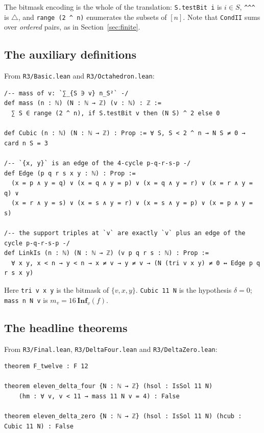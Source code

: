 \documentclass[11pt,reqno]{amsart}
\theoremstyle{plain}
\theoremstyle{definition}
\numberwithin{theorem}{section}
\newcommand{\Inf}{\mathbf{Inf}}
\newcommand{\sd}{\mathbin{\triangle}}
\begin{document}
The bitmask encoding is the whole of the translation: \texttt{S.testBit i} is $i \in S$,
\texttt{\^{}\^{}\^{}} is $\sd$, and \texttt{range (2 \^{} n)} enumerates the subsets of $[n]$.
Note that \texttt{CondII} sums over \emph{ordered} pairs, as in Section~\ref{sec:finite}.

\subsection{The auxiliary definitions}
From \texttt{R3/Basic.lean} and \texttt{R3/Octahedron.lean}:

\begin{Verbatim}[fontsize=\footnotesize,formatcom=\ttfamily,samepage=false]
/-- mass of v: `∑_{S ∋ v} n_S²` -/
def mass (n : ℕ) (N : ℕ → ℤ) (v : ℕ) : ℤ :=
  ∑ S ∈ range (2 ^ n), if S.testBit v then (N S) ^ 2 else 0

def Cubic (n : ℕ) (N : ℕ → ℤ) : Prop := ∀ S, S < 2 ^ n → N S ≠ 0 → card n S = 3

/-- `{x, y}` is an edge of the 4-cycle p-q-r-s-p -/
def Edge (p q r s x y : ℕ) : Prop :=
  (x = p ∧ y = q) ∨ (x = q ∧ y = p) ∨ (x = q ∧ y = r) ∨ (x = r ∧ y = q) ∨
  (x = r ∧ y = s) ∨ (x = s ∧ y = r) ∨ (x = s ∧ y = p) ∨ (x = p ∧ y = s)

/-- the support triples at `v` are exactly `v` plus an edge of the cycle p-q-r-s-p -/
def LinkIs (n : ℕ) (N : ℕ → ℤ) (v p q r s : ℕ) : Prop :=
  ∀ x y, x < n → y < n → x ≠ v → y ≠ v → (N (tri v x y) ≠ 0 ↔ Edge p q r s x y)
\end{Verbatim}

Here \texttt{tri v x y} is the bitmask of $\{v,x,y\}$. \texttt{Cubic 11 N} is the hypothesis
$\delta = 0$; \texttt{mass n N v} is $m_v = 16\,\Inf_v(f)$.

\subsection{The headline theorems}
From \texttt{R3/Final.lean}, \texttt{R3/DeltaFour.lean} and \texttt{R3/DeltaZero.lean}:

\begin{Verbatim}[fontsize=\footnotesize,formatcom=\ttfamily,samepage=false]
theorem F_twelve : F 12

theorem eleven_delta_four {N : ℕ → ℤ} (hsol : IsSol 11 N)
    (hm : ∀ v, v < 11 → mass 11 N v = 4) : False

theorem eleven_delta_zero {N : ℕ → ℤ} (hsol : IsSol 11 N) (hcub : Cubic 11 N) : False
\end{Verbatim}
\end{document}
